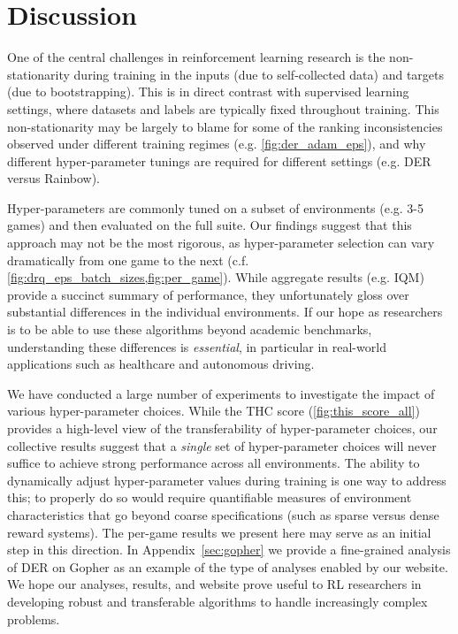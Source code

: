 \section{Discussion}
\label{sec:discussion}
One of the central challenges in reinforcement learning research is the non-stationarity during training in the inputs (due to self-collected data) and targets (due to bootstrapping). This is in direct contrast with supervised learning settings, where datasets and labels are typically fixed throughout training. This non-stationarity may be largely to blame for some of the ranking inconsistencies observed under different training regimes (e.g. \autoref{fig:der_adam_eps}), and why different hyper-parameter tunings are required for different settings (e.g. DER versus Rainbow).

Hyper-parameters are commonly tuned on a subset of environments (e.g. 3-5 games) and then evaluated on the full suite. Our findings suggest that this approach may not be the most rigorous, as hyper-parameter selection can vary dramatically from one game to the next (c.f. \cref{fig:drq_eps_batch_sizes,fig:per_game}).
While aggregate results (e.g. IQM) provide a succinct summary of performance, they unfortunately gloss over substantial differences in the individual environments. If our hope as researchers is to be able to use these algorithms beyond academic benchmarks, understanding these differences is {\em essential}, in particular in real-world applications such as healthcare and autonomous driving.

We have conducted a large number of experiments to investigate the impact of various hyper-parameter choices. While the THC score (\autoref{fig:this_score_all}) provides a high-level view of the transferability of hyper-parameter choices, our collective results suggest that a {\em single} set of hyper-parameter choices will never suffice to achieve strong performance across all environments. The ability to dynamically adjust hyper-parameter values during training is one way to address this; to properly do so would require quantifiable measures of environment characteristics that go beyond coarse specifications (such as sparse versus dense reward systems). The per-game results we present here may serve as an initial step in this direction. In Appendix~\ref{sec:gopher} we provide a fine-grained analysis of DER on Gopher as an example of the type of analyses enabled by our website. We hope our analyses, results, and website prove useful to RL researchers in developing robust and  transferable algorithms to handle increasingly complex problems.\\

